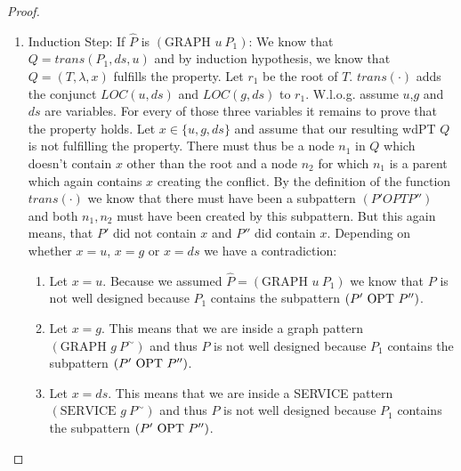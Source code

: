 \begin{proof}
\begin{enumerate}
\begin{enumerate}
				\item Induction Step: If $\hat{P}$ is $(\mbox{GRAPH }  u \ P_1)$:
					We know that $Q = trans(P_1,ds,u)$ and by induction hypothesis,
					we know that $Q = (T, \lambda,x)$ fulfills the property. Let
					$r_1$ be the root of $T$. $trans(\cdot)$ adds the conjunct
					$LOC(u,ds)$ and $LOC(g,ds)$ to $r_1$. W.l.o.g. assume $u$,$g$
					and $ds$ are variables. For every of those three variables it
					remains to prove that the property holds.
					Let $x \in \{u,g,ds\}$ and assume that our resulting wdPT $Q$ is
					not fulfilling the property. There must thus be a node $n_1$ in $Q$ which
					doesn't contain $x$ other than the root and a node $n_2$ for which $n_1$ is a parent 
					which again contains $x$ creating the conflict.
					By the definition of the function $trans(\cdot)$ we know that
					there must have been a subpattern $(P' OPT P'')$ and both $n_1,n_2$ must
					have been created by this subpattern. But this again means, that
					$P'$ did not contain $x$ and $P''$ did contain $x$. 
					Depending on whether $x = u$, $x=g$ or $x=ds$ we have a
					contradiction:
					\begin{enumerate}
						\item Let $x=u$. Because we assumed $\hat{P}=
							(\mbox{GRAPH } u \ P_1)$ we know that
							$P$ is not well designed because $P_1$ contains the
							subpattern $(P' \mbox{ OPT } P'')$.
						\item Let $x = g$. This means that we are inside a graph
							pattern $(\mbox{GRAPH } g \ P^\sim)$ and thus $P$ is
							not well designed because $P_1$ contains the
							subpattern $(P' \mbox{ OPT } P'')$.
						\item Let $x = ds$. This means that we are inside a
							SERVICE
							pattern $(\mbox{SERVICE } g \ P^\sim)$ and thus $P$ is
							not well designed because $P_1$ contains the
							subpattern $(P' \mbox{ OPT } P'')$.
					\end{enumerate}




\end{enumerate}
\end{enumerate}
\end{proof}
